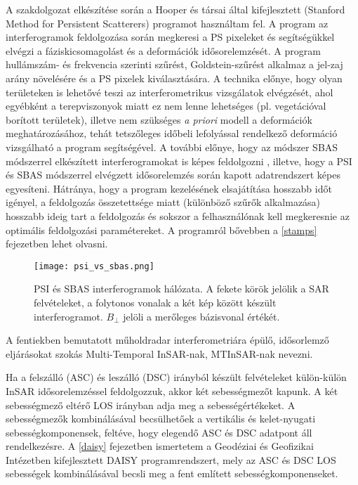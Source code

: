\documentclass[12pt]{report}
\numberwithin{equation}{section}
\numberwithin{table}{section}
\numberwithin{figure}{section}
\begin{document}
A szakdolgozat elkészítése során a Hooper és társai \cite{Hooper2008, Hooper2012} által kifejlesztett \stamps (Stanford Method for Persistent Scatterers)  programot használtam fel. A program az interferogramok feldolgozása során megkeresi a PS pixeleket és segítségükkel elvégzi a fáziskicsomagolást és a deformációk idősorelemzését. A program hullámszám- és frekvencia szerinti szűrést, Goldstein-szűrést \cite{GoldsteinFilter} alkalmaz a jel-zaj arány növelésére és a PS pixelek kiválasztására. A technika előnye, hogy olyan területeken is lehetővé teszi az interferometrikus vizsgálatok elvégzését, ahol egyébként a terepviszonyok miatt ez nem lenne lehetséges (pl. vegetációval borított területek), illetve nem szükséges \textit{a priori} modell a deformációk meghatározásához, tehát tetszőleges időbeli lefolyással rendelkező deformáció vizsgálható a program segítségével. A \stamps további előnye, hogy az módszer SBAS módszerrel elkészített interferogramokat is képes feldolgozni \cite{Hooper2008}, illetve, hogy a PSI és SBAS módszerrel elvégzett idősorelemzés során kapott adatrendszert képes egyesíteni. Hátránya, hogy a program kezelésének elsajátítása hosszabb időt igényel, a feldolgozás összetettsége miatt (különböző szűrők alkalmazása) hosszabb ideig tart a feldolgozás és sokszor a felhasználónak kell megkeresnie az optimális feldolgozási paramétereket. A \stamps programról bővebben a \ref{stamps} fejezetben lehet olvasni.

\begin{figure}[H]
    \centering
    \texttt{[image: psi\_vs\_sbas.png]}
    \caption{PSI és SBAS interferogramok hálózata. A fekete körök jelölik a SAR felvételeket, a folytonos vonalak a két kép között készült interferogramot. $B_{\perp}$ jelöli a merőleges bázisvonal értékét.}\label{psi_sbas}
\end{figure}

A fentiekben bemutatott műholdradar interferometriára épülő, idősorlemző eljárásokat szokás Multi-Temporal InSAR-nak, MTInSAR-nak nevezni.

Ha a felszálló (ASC) és leszálló (DSC) irányból készült felvételeket külön-külön InSAR idősorelemzéssel feldolgozzuk, akkor két sebességmezőt kapunk. A két sebességmező eltérő LOS irányban adja meg a sebességértékeket. A sebességmezők kombinálásával becsülhetőek a vertikális és kelet-nyugati sebességkomponensek, feltéve, hogy elegendő ASC és DSC adatpont áll rendelkezésre. A \ref{daisy} fejezetben ismertetem a Geodéziai és Geofizikai Intézetben kifejlesztett DAISY programrendszert, mely az ASC és DSC LOS sebességek kombinálásával becsli meg a  fent említett sebességkomponenseket.
\end{document}
